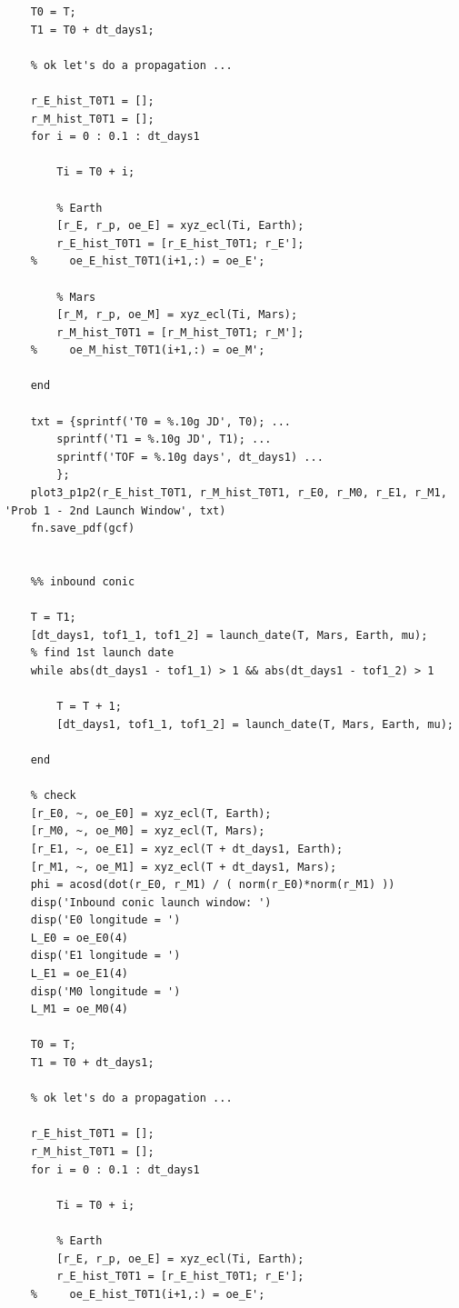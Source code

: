 \documentclass[conf]{new-aiaa}
\begin{document}
\begin{lstlisting}
    T0 = T; 
    T1 = T0 + dt_days1; 
    
    % ok let's do a propagation ... 
    
    r_E_hist_T0T1 = []; 
    r_M_hist_T0T1 = []; 
    for i = 0 : 0.1 : dt_days1
        
        Ti = T0 + i; 
        
        % Earth 
        [r_E, r_p, oe_E] = xyz_ecl(Ti, Earth); 
        r_E_hist_T0T1 = [r_E_hist_T0T1; r_E']; 
    %     oe_E_hist_T0T1(i+1,:) = oe_E'; 
        
        % Mars 
        [r_M, r_p, oe_M] = xyz_ecl(Ti, Mars); 
        r_M_hist_T0T1 = [r_M_hist_T0T1; r_M']; 
    %     oe_M_hist_T0T1(i+1,:) = oe_M'; 
        
    end 
    
    txt = {sprintf('T0 = %.10g JD', T0); ... 
        sprintf('T1 = %.10g JD', T1); ... 
        sprintf('TOF = %.10g days', dt_days1) ... 
        }; 
    plot3_p1p2(r_E_hist_T0T1, r_M_hist_T0T1, r_E0, r_M0, r_E1, r_M1, 'Prob 1 - 2nd Launch Window', txt)
    fn.save_pdf(gcf)
    
    
    %% inbound conic 
    
    T = T1;
    [dt_days1, tof1_1, tof1_2] = launch_date(T, Mars, Earth, mu); 
    % find 1st launch date 
    while abs(dt_days1 - tof1_1) > 1 && abs(dt_days1 - tof1_2) > 1
    
        T = T + 1; 
        [dt_days1, tof1_1, tof1_2] = launch_date(T, Mars, Earth, mu); 
        
    end 
    
    % check 
    [r_E0, ~, oe_E0] = xyz_ecl(T, Earth); 
    [r_M0, ~, oe_M0] = xyz_ecl(T, Mars); 
    [r_E1, ~, oe_E1] = xyz_ecl(T + dt_days1, Earth); 
    [r_M1, ~, oe_M1] = xyz_ecl(T + dt_days1, Mars); 
    phi = acosd(dot(r_E0, r_M1) / ( norm(r_E0)*norm(r_M1) ))
    disp('Inbound conic launch window: ')
    disp('E0 longitude = ') 
    L_E0 = oe_E0(4)
    disp('E1 longitude = ') 
    L_E1 = oe_E1(4)
    disp('M0 longitude = ') 
    L_M1 = oe_M0(4)
    
    T0 = T; 
    T1 = T0 + dt_days1; 
    
    % ok let's do a propagation ... 
    
    r_E_hist_T0T1 = []; 
    r_M_hist_T0T1 = []; 
    for i = 0 : 0.1 : dt_days1
        
        Ti = T0 + i; 
        
        % Earth 
        [r_E, r_p, oe_E] = xyz_ecl(Ti, Earth); 
        r_E_hist_T0T1 = [r_E_hist_T0T1; r_E']; 
    %     oe_E_hist_T0T1(i+1,:) = oe_E'; 
        

\end{lstlisting}
\end{document}
